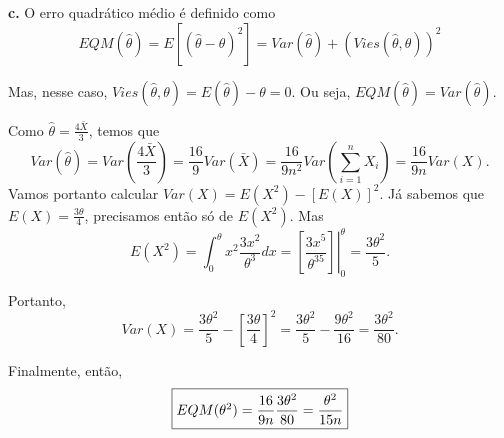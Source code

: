 \documentclass[12pt,a4paper]{article}
\begin{document}
\bigskip

\textbf{c.} O erro quadrático médio é definido como $$EQM(\hat{\theta}) = E[(\hat{\theta}-\theta)^2] = Var(\hat{\theta}) + (Vies(\hat{\theta},\theta))^2$$

Mas, nesse caso, $Vies(\hat{\theta},\theta) = E(\hat{\theta}) - \theta = 0$. Ou seja, $EQM(\hat{\theta}) = Var(\hat{\theta})$. 

Como $\hat{\theta} = \frac{4\bar{X}}{3}$, temos que $$Var(\hat{\theta}) = Var(\frac{4\bar{X}}{3}) = \frac{16}{9}Var(\bar{X}) = \frac{16}{9n^2}Var(\sum_{i=1}^nX_i) = \frac{16}{9n}Var(X).$$ Vamos portanto calcular $Var(X) = E(X^2) - [E(X)]^2$. Já sabemos que $E(X) = \frac{3\theta}{4}$, precisamos então só de $E(X^2)$. Mas $$E(X^2) = \int_{0}^{\theta}x^2\frac{3x^2}{\theta^3}dx = \left.\left[\frac{3x^5}{\theta^35}\right]\right|_0^{\theta} = \frac{3\theta^2}{5}.$$

Portanto, $$Var(X) = \frac{3\theta^2}{5} - \left[\frac{3\theta}{4}\right]^2 = \frac{3\theta^2}{5} - \frac{9\theta^2}{16} = \frac{3\theta^2}{80}.$$

Finalmente, então, $$\fbox{$EQM(\theta^2) = \dfrac{16}{9n}\dfrac{3\theta^2}{80} = \dfrac{\theta^2}{15n}$}$$
\end{document}
